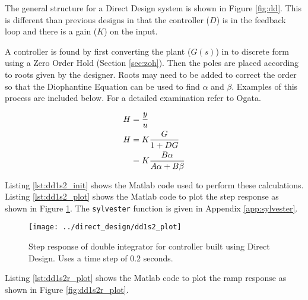 \documentclass{article}
\newcommand{\sincludepdf}[2][]{
	
}
\begin{document}
The general structure for a Direct Design system is shown in
Figure \ref{fig:dd}.
This is different than previous designs in that the controller ($D$)
is in the feedback loop and there is a gain ($K$) on the input.

A controller is found by first converting the plant ($G(s)$) in to discrete
form using a Zero Order Hold (Section \ref{sec:zoh}).
Then the poles are placed according to roots given by the designer.
Roots may need to be added to correct the order so that the Diophantine
Equation can be used to find $\alpha$ and $\beta$.
Examples of this process are included below.
For a detailed examination refer to Ogata\autocite[Pg. 517]{ogata1995discrete}.

\begin{align}
	H &= \frac{y}{u} \notag \\
	H &= K \frac{G}{1 + D G} \\
	  &= K \frac{B \alpha}{A \alpha + B \beta}
\end{align}

\sincludepdf[pages=1,
			pagecommand=\subsection*{Example 1}
	]{scan/11211302.pdf}
\sincludepdf[pages=2-5]{scan/11211302.pdf}

Listing \ref{lst:dd1s2_init} shows the Matlab code used to perform
these calculations.
Listing \ref{lst:dd1s2_plot} shows the Matlab code to plot the step response
as shown in Figure \ref{fig:dd1s2_plot}.
The \verb+sylvester+ function is given in Appendix \ref{app:sylvester}.



\clearpage


\begin{figure}
\begin{center}
\texttt{[image: ../direct\_design/dd1s2\_plot]}
\end{center}
\caption{Step response of double integrator for controller built
using Direct Design. Uses a time step of 0.2 seconds.}
\label{fig:dd1s2_plot}
\end{figure}

\clearpage
Listing \ref{lst:dd1s2r_plot} shows the Matlab code to plot the ramp response
as shown in Figure \ref{fig:dd1s2r_plot}.
\end{document}
